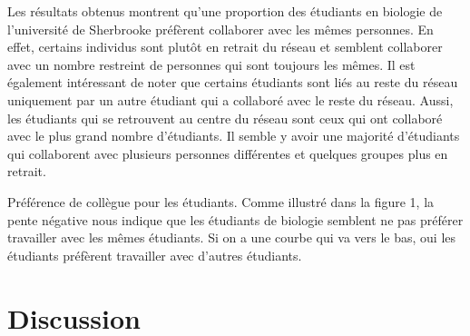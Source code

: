 \documentclass[9pt,twocolumn,twoside,]{pnas-new}
\begin{document}
Les résultats obtenus montrent qu'une proportion des étudiants en
biologie de l'université de Sherbrooke préfèrent collaborer avec les
mêmes personnes. En effet, certains individus sont plutôt en retrait du
réseau et semblent collaborer avec un nombre restreint de personnes qui
sont toujours les mêmes. Il est également intéressant de noter que
certains étudiants sont liés au reste du réseau uniquement par un autre
étudiant qui a collaboré avec le reste du réseau. Aussi, les étudiants
qui se retrouvent au centre du réseau sont ceux qui ont collaboré avec
le plus grand nombre d'étudiants. Il semble y avoir une majorité
d'étudiants qui collaborent avec plusieurs personnes différentes et
quelques groupes plus en retrait.

Préférence de collègue pour les étudiants. Comme illustré dans la figure
1, la pente négative nous indique que les étudiants de biologie semblent
ne pas préférer travailler avec les mêmes étudiants. Si on a une courbe
qui va vers le bas, oui les étudiants préfèrent travailler avec d'autres
étudiants.

\hypertarget{discussion}{%
\section{Discussion}\label{discussion}}
\end{document}
